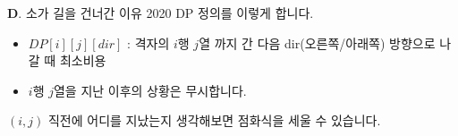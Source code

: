 \begin{frame}{\textbf{D}. 소가 길을 건너간 이유 2020}
    DP 정의를 이렇게 합니다.
    \begin{itemize}
        \item $DP[i][j][dir]$ : 격자의 $i$행 $j$열 까지 간 다음 dir(오른쪽/아래쪽) 방향으로 나갈 때 최소비용
        \item $i$행 $j$열을 지난 이후의 상황은 무시합니다.
    \end{itemize}
    \vspace{0.2in}
    $(i,j)$ 직전에 어디를 지났는지 생각해보면 점화식을 세울 수 있습니다.
\end{frame}